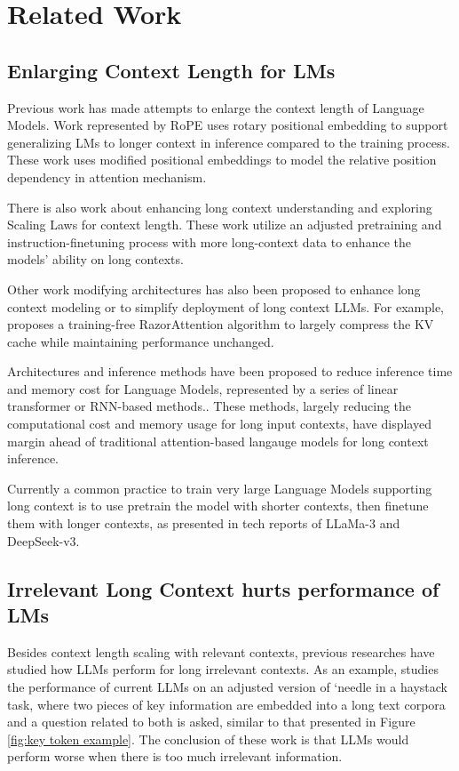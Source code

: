 \section{Related Work}
\subsection{Enlarging Context Length for LMs}

Previous work has made attempts to enlarge the context length of Language Models. Work represented by RoPE\cite{rope} uses rotary positional embedding to support generalizing LMs to longer context in inference compared to the training process. These work uses modified positional embeddings to model the relative position dependency in attention mechanism.

There is also work about enhancing long context understanding and exploring Scaling Laws for context length\cite{longllamascaling}. These work utilize an adjusted pretraining and instruction-finetuning process with more long-context data to enhance the models' ability on long contexts.

Other work modifying architectures has also been proposed to enhance long context modeling or to simplify deployment of long context LLMs. For example, \cite{razorattention} proposes a training-free RazorAttention algorithm to largely compress the KV cache while maintaining performance unchanged.

Architectures and inference methods have been proposed to reduce inference time and memory cost for Language Models, represented by a series of linear transformer or RNN-based methods.\cite{linearattention, mamba, tttllm}. These methods, largely reducing the computational cost and memory usage for long input contexts, have displayed margin ahead of traditional attention-based langauge models for long context inference.


Currently a common practice to train very large Language Models supporting long context is to use pretrain the model with shorter contexts, then finetune them with longer contexts, as presented in tech reports of LLaMa-3\cite{llama3} and DeepSeek-v3\cite{deepseekv3}.

\subsection{Irrelevant Long Context hurts performance of LMs}

Besides context length scaling with relevant contexts, previous researches have studied how LLMs perform for long irrelevant contexts. As an example, \cite{sametaskmoretoken} studies the performance of current LLMs on an adjusted version of `needle in a haystack task, where two pieces of key information are embedded into a long text corpora and a question related to both is asked, similar to that presented in Figure \ref{fig:key token example}. The conclusion of these work is that LLMs would perform worse when there is too much irrelevant information.


